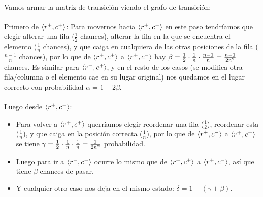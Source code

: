 \documentclass[../main.tex]{subfiles}
\begin{document}
\paragraph{} Vamos armar la matriz de transición viendo el grafo de transición:

\paragraph{} Primero de \(\langle r^{+}, c^{+} \rangle\): Para movernos hacia \(\langle r^{+}, c^{-} \rangle\) en este paso tendríamos que elegir alterar una fila (\(\frac{1}{2}\) chances), alterar la fila en la que se encuentra el elemento (\(\frac{1}{n}\) chances), y que caiga en cualquiera de las otras posiciones de la fila (\(\frac{n-1}{n}\) chances), por lo que de \(\langle r^{+}, c^{+} \rangle\) a \(\langle r^{+}, c^{-} \rangle\) hay \(\beta = \frac{1}{2} \cdot \frac{1}{n} \cdot \frac{n-1}{n} = \frac{n-1}{2n^{2}}\) chances. Es similar para \(\langle r^{-}, c^{+} \rangle\), y en el resto de los casos (se modifica otra fila/columna o el elemento cae en su lugar original) nos quedamos en el lugar correcto con probabilidad \(\alpha = 1 - 2\beta\).

\begin{figure}[H]
  \centering
\end{figure}

\paragraph{} Luego desde \(\langle r^{+}, c^{-} \rangle\):
\begin{itemize}
  \item Para volver a \(\langle r^{+}, c^{+} \rangle\) querríamos elegir reordenar una fila (\(\frac{1}{2}\)), reordenar esta (\(\frac{1}{n}\)), y que caiga en la posición correcta (\(\frac{1}{n}\)), por lo que de \(\langle r^{+}, c^{-} \rangle\) a \(\langle r^{+}, c^{+} \rangle\) se tiene \(\gamma = \frac{1}{2} \cdot \frac{1}{n} \cdot \frac{1}{n} = \frac{1}{2n^{2}}\) probabilidad.
  \item Luego para ir a \(\langle r^{-}, c^{-} \rangle\) ocurre lo mismo que de \(\langle r^{+}, c^{+} \rangle\) a \(\langle r^{+}, c^{-} \rangle\), así que tiene \(\beta\) chances de pasar.
  \item Y cualquier otro caso nos deja en el mismo estado: \(\delta = 1 - (\gamma + \beta)\).
\end{itemize}
\end{document}
